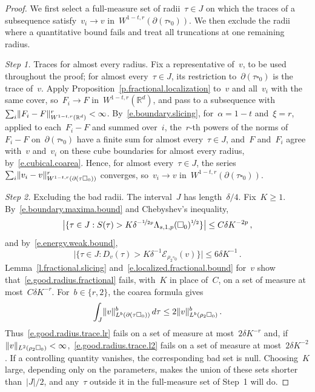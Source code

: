 \documentclass[11pt,letterpaper]{article}
\numberwithin{equation}{section}
\theoremstyle{definition}
\newcommand{\Rd}{\mathbb{R}^d}
\newcommand{\nf}{\nicefrac}
\newcommand{\cu}{\square}
\DeclarePairedDelimiter{\norm}{\lVert}{\rVert}
\newcommand{\Ener}{\mathcal E}
\begin{document}
\begin{proof}
We first select a full-measure set of radii~$\tau\in J$ on which the traces of a subsequence satisfy~$v_i\to v$ in~$W^{1-t,r}(\partial(\tau\cu_0))$. We then exclude the radii where a quantitative bound fails and treat all truncations at one remaining radius.

\smallskip

\emph{Step 1.} Traces for almost every radius. Fix a representative of~$v$, to be used throughout the proof; for almost every~$\tau\in J$, its restriction to~$\partial(\tau\cu_0)$ is the trace of~$v$. Apply Proposition~\ref{p.fractional.localization} to~$v$ and all~$v_i$ with the same cover, so~$F_i\to F$ in~$W^{1-t,r}(\Rd)$, and pass to a subsequence with~$\sum_i\norm{F_i-F}_{W^{1-t,r}(\Rd)}^r<\infty$. By~\eqref{e.boundary.slicing}, for~$\alpha=1-t$ and~$\xi=r$, applied to each~$F_i-F$ and summed over~$i$, the~$r$-th powers of the norms of~$F_i-F$ on~$\partial(\tau\cu_0)$ have a finite sum for almost every~$\tau\in J$, and~$F$ and~$F_i$ agree with~$v$ and~$v_i$ on these cube boundaries for almost every radius, by~\eqref{e.cubical.coarea}. Hence, for almost every~$\tau\in J$, the series~$\sum_i\norm{v_i-v}_{W^{1-t,r}(\partial(\tau\cu_0))}^r$ converges, so~$v_i\to v$ in~$W^{1-t,r}(\partial(\tau\cu_0))$.

\smallskip

\emph{Step 2.} Excluding the bad radii. The interval~$J$ has length~$\delta/4$. Fix~$K\geq1$. By~\eqref{e.boundary.maxima.bound} and Chebyshev's inequality,
\begin{equation*}
	\bigl|\{\tau\in J:S(\tau)>K\delta^{-\nf1{2p}}\Lambda_{s,1,p}(\cu_0)^{\nf12}\}\bigr|\leq C\delta K^{-2p}\,,
\end{equation*}
and by~\eqref{e.energy.weak.bound},
\begin{equation*}
	\bigl|\{\tau\in J:D_v(\tau)>K\delta^{-1}\Ener_{\rho_2\cu_0}(v)\}\bigr|\leq6\delta K^{-1}\,.
\end{equation*}
Lemma~\ref{l.fractional.slicing} and~\eqref{e.localized.fractional.bound} for~$v$ show that~\eqref{e.good.radius.fractional} fails, with~$K$ in place of~$C$, on a set of measure at most~$C\delta K^{-r}$. For~$b\in\{r,2\}$, the coarea formula gives
\begin{equation*}
	\int_J\norm{v}_{L^b(\partial(\tau\cu_0))}^b\,d\tau\leq2\norm{v}_{L^b(\rho_2\cu_0)}^b\,.
\end{equation*}
Thus~\eqref{e.good.radius.trace.lr} fails on a set of measure at most~$2\delta K^{-r}$ and, if~$\norm{v}_{L^2(\rho_2\cu_0)}<\infty$,~\eqref{e.good.radius.trace.l2} fails on a set of measure at most~$2\delta K^{-2}$. If a controlling quantity vanishes, the corresponding bad set is null. Choosing~$K$ large, depending only on the parameters, makes the union of these sets shorter than~$|J|/2$, and any~$\tau$ outside it in the full-measure set of Step~1 will do.


\end{proof}
\end{document}
